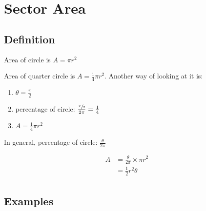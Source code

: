 \documentclass{exam}
\begin{document}
  \section{Sector Area}

  \subsection{Definition}
  Area of circle is $A = \pi r^2$

  Area of quarter circle is $A = \frac{1}{4} \pi r^2$.  Another way of looking at it is:
  \begin{enumerate}
    \item $\theta = \frac{\pi}{2}$
    \item percentage of circle: $\frac{\sfrac{\pi}{2}}{2 \pi} = \frac{1}{4}$
    \item $A = \frac{1}{4} \pi r^2$
  \end{enumerate}

  In general, percentage of circle: $\frac{\theta}{2 \pi}$

  \begin{align*}
    A & = \frac{\theta}{2 \pi} \times \pi r^2 \\
      & = \frac{1}{2} r^2 \theta \\
  \end{align*}

  \subsection{Examples}
\end{document}
